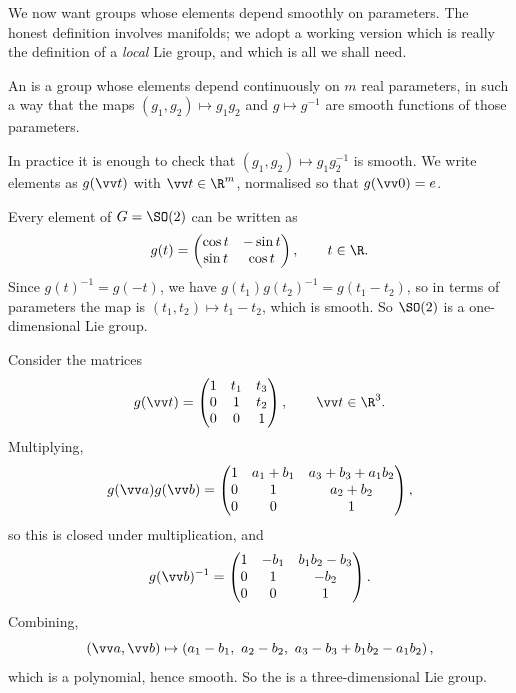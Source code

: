 We now want groups whose elements depend smoothly on parameters. The honest definition involves manifolds; we adopt a working version which is really the definition of a \emph{local} Lie group, and which is all we shall need.

\begin{definition}
	An  is a group whose elements depend continuously on $m$ real parameters, in such a way that the maps $(g_1,g_2)\mapsto g_1g_2$ and $g\mapsto g^{-1}$ are smooth functions of those parameters.
\end{definition}

In practice it is enough to check that $(g_1,g_2)\mapsto g_1g_2^{-1}$ is smooth. We write elements as $g(\vv t)$ with $\vv t\in\R^m$, normalised so that $g(\vv 0) = e$.

\begin{example}
	Every element of $G = \SO(2)$ can be written as
	$$
	g(t) = \begin{pmatrix}\cos t & -\sin t\\ \sin t & \cos t\end{pmatrix}, \qquad t\in\R.
	$$
	Since $g(t)^{-1} = g(-t)$, we have $g(t_1)g(t_2)^{-1} = g(t_1 - t_2)$, so in terms of parameters the map is $(t_1,t_2)\mapsto t_1 - t_2$, which is smooth. So $\SO(2)$ is a one-dimensional Lie group.
\end{example}

\begin{example}
	Consider the matrices
	$$
	g(\vv t) = \begin{pmatrix}1 & t_1 & t_3\\ 0 & 1 & t_2\\ 0&0&1\end{pmatrix}, \qquad \vv t\in\R^3.
	$$
	Multiplying,
	$$
	g(\vv a)g(\vv b) = \begin{pmatrix}1 & a_1+b_1 & a_3+b_3+a_1b_2\\ 0 & 1 & a_2+b_2\\ 0&0&1\end{pmatrix},
	$$
	so this is closed under multiplication, and
	$$
	g(\vv b)^{-1} = \begin{pmatrix}1 & -b_1 & b_1b_2-b_3\\ 0&1&-b_2\\ 0&0&1\end{pmatrix}.
	$$
	Combining,
	$$
	(\vv a, \vv b)\mapsto \left(a_1 - b_1,\ a_2-b_2,\ a_3 - b_3 + b_1b_2 - a_1b_2\right),
	$$
	which is a polynomial, hence smooth. So the  is a three-dimensional Lie group.
\end{example}

